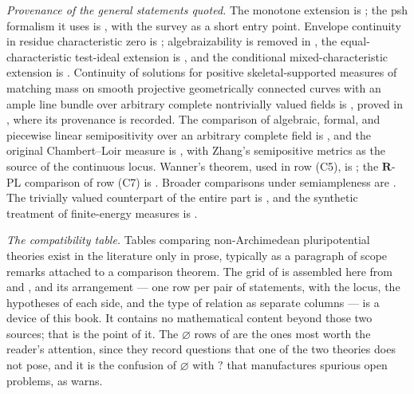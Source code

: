 \emph{Provenance of the general statements quoted.}  The monotone extension
 is \cite[Theorem~3.1]{BFJ15}; the psh
formalism it uses is \cite{BFJ16}, with the survey \cite{BFJ16b} as a short
entry point.  Envelope continuity in residue characteristic zero is
\cite{BFJ15}; algebraizability is removed in \cite{BGGJKM20}, the
equal-characteristic test-ideal extension is \cite{GJKM19}, and the
conditional mixed-characteristic extension is \cite{FGK25}.  Continuity of
solutions for positive skeletal-supported measures of matching mass on
smooth projective geometrically connected curves with an ample line bundle
over arbitrary complete nontrivially valued fields is
, proved in
, where its provenance is recorded.  The
comparison of algebraic, formal, and
piecewise linear semipositivity over an arbitrary complete field is
\cite{GM19}, and the original Chambert--Loir measure is \cite{CL06}, with
Zhang's semipositive metrics \cite{Zhang1995} as the source of the
continuous locus.  Wanner's theorem, used in row (C5), is
\cite{Wanner19}; the \(\mathbf R\)-PL comparison of row (C7) is
\cite{GR25Classical,GR25PL}.  Broader comparisons under semiampleness are
\cite{BE21}.  The trivially valued counterpart of the entire part is
\cite{BJ22}, and the synthetic treatment of finite-energy measures is
\cite{BJ25FiniteEnergy}.

\emph{The compatibility table.}  Tables comparing non-Archimedean
pluripotential theories exist in the literature only in prose, typically as
a paragraph of scope remarks attached to a comparison theorem.  The grid of
 is assembled here from
 and
, and its arrangement --- one row per pair
of statements, with the locus, the hypotheses of each side, and the type of
relation as separate columns --- is a device of this book.  It contains no
mathematical content beyond those two sources; that is the point of it.  The
\(\varnothing\) rows of  are the ones most worth
the reader's attention, since they record questions that one of the two
theories does not pose, and it is the confusion of \(\varnothing\) with
\(?\) that manufactures spurious open problems, as
 warns.

